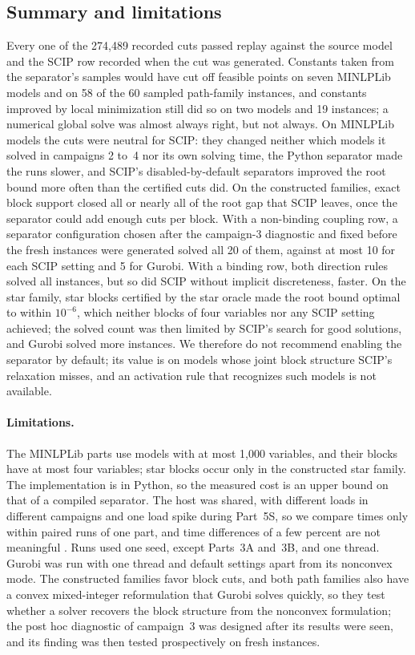 \subsection{Summary and limitations}\label{sec:comp-summary}

Every one of the 274{,}489 recorded cuts passed replay against the source
model and the SCIP row recorded when the cut was generated. Constants taken from the separator's samples
would have cut off feasible points on seven MINLPLib models and on 58 of the 60
sampled path-family instances, and constants improved by local minimization
still did so on two models and 19 instances; a numerical global solve was
almost always right, but not always. On MINLPLib models the cuts were neutral
for SCIP: they changed neither which models it solved in campaigns 2 to~4 nor
its own solving time, the Python separator made the runs slower, and SCIP's
disabled-by-default separators improved the root bound more often than the
certified cuts did. On the constructed families, exact block support closed
all or nearly all of the root gap that SCIP leaves, once the separator could add
enough cuts per block. With a non-binding coupling row, a separator
configuration chosen after the campaign-3 diagnostic and fixed before the fresh
instances were generated solved all 20 of them, against at most 10 for each
SCIP setting and 5 for Gurobi. With a binding row, both direction rules solved
all instances, but so did SCIP without implicit discreteness, faster. On the
star family, star blocks certified by the star oracle made the root bound
optimal to within $10^{-6}$, which neither blocks of four variables nor any SCIP setting achieved;
the solved count was then limited by SCIP's search for good solutions, and
Gurobi solved more instances. We therefore do not recommend enabling the
separator by default; its value is on models whose joint block structure
SCIP's relaxation misses, and an activation rule that recognizes such models
is not available.

\paragraph{Limitations.} The MINLPLib parts use models with at most 1{,}000
variables, and their blocks have at most four variables; star blocks occur only
in the constructed star family. The implementation is in Python, so the
measured cost is an upper bound on that of a compiled separator. The host was
shared, with different loads in different campaigns and one load spike during
Part~5S, so we compare times only within paired runs of one part, and time
differences of a few percent are not meaningful \citep{LodiTramontani2013}.
Runs used one seed, except Parts~3A and~3B, and one thread. Gurobi was run with
one thread and default settings apart from its nonconvex mode. The constructed
families favor block cuts, and both path families also have a convex
mixed-integer reformulation that Gurobi solves quickly, so they test whether a
solver recovers the block structure from the nonconvex formulation; the post hoc diagnostic of campaign~3 was designed
after its results were seen, and its finding was then tested prospectively on
fresh instances.
